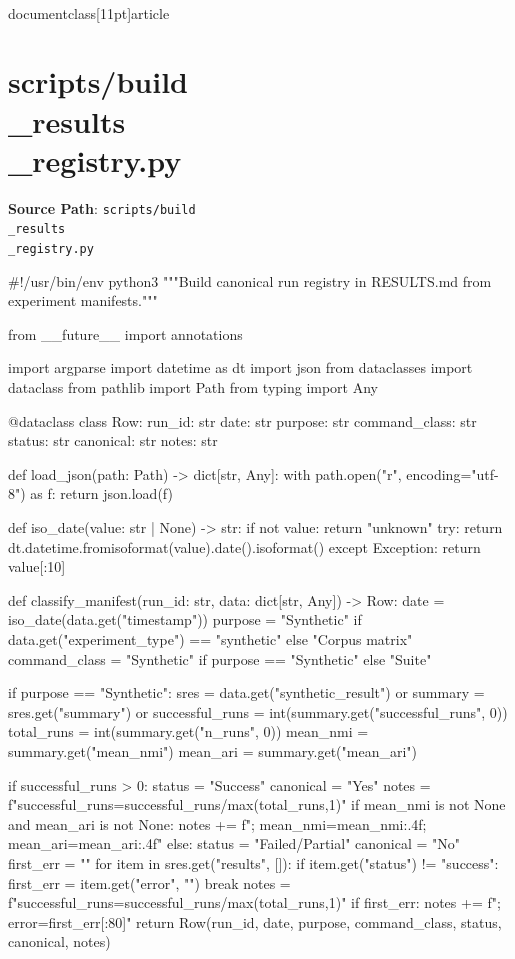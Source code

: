 \\documentclass[11pt]{article}
\begin{document}
\section*{scripts/build\\_results\\_registry.py}
\textbf{Source Path}: \texttt{scripts/build\\_results\\_registry.py}\par
\bigskip
\begin{CodeBlock}
#!/usr/bin/env python3
"""Build canonical run registry in RESULTS.md from experiment manifests."""

from __future__ import annotations

import argparse
import datetime as dt
import json
from dataclasses import dataclass
from pathlib import Path
from typing import Any


@dataclass
class Row:
    run_id: str
    date: str
    purpose: str
    command_class: str
    status: str
    canonical: str
    notes: str


def load_json(path: Path) -> dict[str, Any]:
    with path.open("r", encoding="utf-8") as f:
        return json.load(f)


def iso_date(value: str | None) -> str:
    if not value:
        return "unknown"
    try:
        return dt.datetime.fromisoformat(value).date().isoformat()
    except Exception:
        return value[:10]


def classify_manifest(run_id: str, data: dict[str, Any]) -> Row:
    date = iso_date(data.get("timestamp"))
    purpose = "Synthetic" if data.get("experiment_type") == "synthetic" else "Corpus matrix"
    command_class = "Synthetic" if purpose == "Synthetic" else "Suite"

    if purpose == "Synthetic":
        sres = data.get("synthetic_result") or {}
        summary = sres.get("summary") or {}
        successful_runs = int(summary.get("successful_runs", 0))
        total_runs = int(summary.get("n_runs", 0))
        mean_nmi = summary.get("mean_nmi")
        mean_ari = summary.get("mean_ari")

        if successful_runs > 0:
            status = "Success"
            canonical = "Yes"
            notes = f"successful_runs={successful_runs}/{max(total_runs,1)}"
            if mean_nmi is not None and mean_ari is not None:
                notes += f"; mean_nmi={mean_nmi:.4f}; mean_ari={mean_ari:.4f}"
        else:
            status = "Failed/Partial"
            canonical = "No"
            first_err = ""
            for item in sres.get("results", []):
                if item.get("status") != "success":
                    first_err = item.get("error", "")
                    break
            notes = f"successful_runs={successful_runs}/{max(total_runs,1)}"
            if first_err:
                notes += f"; error={first_err[:80]}"
        return Row(run_id, date, purpose, command_class, status, canonical, notes)


\end{CodeBlock}
\end{document}
